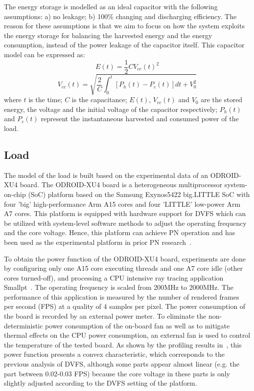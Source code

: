 The energy storage is modelled as an ideal capacitor with the following assumptions: a) no leakage; b) 100\% changing and discharging efficiency. The reason for these assumptions is that we aim to focus on how the system exploits the energy storage for balancing the harvested energy and the energy consumption, instead of the power leakage of the capacitor itself. This capacitor model can be expressed as:
\begin{equation}
    E(t) = \frac{1}{2} C V_{cc}(t)^2
\end{equation}
\begin{equation}
    V_{cc}(t) = \sqrt{\frac{2}{C} \int_0^t [P_h(t) - P_c(t)] dt + V_0^2}
\end{equation}
where $t$ is the time; $C$ is the capacitance; $E(t)$, $V_{cc}(t)$ and $V_0$ are the stored energy, the voltage and the initial voltage of the capacitor respectively; $P_h(t)$ and $P_c(t)$ represent the instantaneous harvested and consumed power of the load.

\subsection{Load}

The model of the load is built based on the experimental data of an ODROID-XU4 board. The ODROID-XU4 board is a heterogeneous multiprocessor system-on-chip (SoC) platform based on the Samsung Exynos5422 big.LITTLE SoC with four 'big' high-performance Arm A15 cores and four 'LITTLE' low-power Arm A7 cores. This platform is equipped with hardware support for DVFS which can be utilized with system-level software methods to adjust the operating frequency and the core voltage. Hence, this platform can achieve PN operation and has been used as the experimental platform in prior PN research~\cite{fletcher2017power}.

To obtain the power function of the ODROID-XU4 board, experiments are done by configuring only one A15 core executing threads and one A7 core idle (other cores turned-off), and processing a CPU intensive ray tracing application Smallpt~\cite{beason10}. The operating frequency is scaled from 200MHz to 2000MHz. The performance of this application is measured by the number of rendered frames per second (FPS) at a quality of 4 samples per pixel. The power consumption of the board is recorded by an external power meter. To eliminate the non-deterministic power consumption of the on-board fan as well as to mitigate thermal effects on the CPU power consumption, an external fan is used to control the temperature of the tested board. As shown by the profiling results in~, this power function presents a convex characteristic, which corresponds to the previous analysis of DVFS, although some parts appear almost linear (e.g. the part between 0.02-0.03 FPS) because the core voltage in these parts is only slightly adjusted according to the DVFS setting of the platform.

